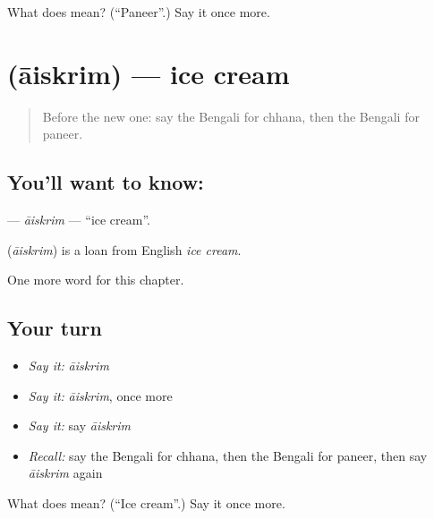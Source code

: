 \begin{tcolorbox}[breakable,colback=teal!4,colframe=teal!35!black,title={Before you move on}]
What does  mean? (\textquotedblleft{}Paneer\textquotedblright{}.) Say it once more.
\end{tcolorbox}
\section[\texorpdfstring{\bn{আইসক্রিম} (āiskrim)}{আইসক্রিম (āiskrim)}]{ (āiskrim) — ice cream}

\label{lesson:BN-C257-aiskrim}



\begin{quote}
Before the new one: say the Bengali for chhana, then the Bengali for paneer.
\end{quote}

\subsection*{You'll want to know: }
\textbf{} — \emph{āiskrim} — \textquotedblleft{}ice cream\textquotedblright{}.

\begin{cousinweb}
\textbf{} (\emph{āiskrim}) is a loan from English \emph{ice cream}.
\end{cousinweb}

\begin{grammarlens}[title={What you've built}]
One more word for this chapter.
\end{grammarlens}

\subsection*{Your turn}
\begin{itemize}
\raggedright
  \item \emph{Say it:} \emph{āiskrim}
  \item \emph{Say it:} \emph{āiskrim}, once more
  \item \emph{Say it:} say \emph{āiskrim}
  \item \emph{Recall:} say the Bengali for chhana, then the Bengali for paneer, then say \emph{āiskrim} again
\end{itemize}

\begin{tcolorbox}[breakable,colback=teal!4,colframe=teal!35!black,title={Before you move on}]
What does  mean? (\textquotedblleft{}Ice cream\textquotedblright{}.) Say it once more.
\end{tcolorbox}
